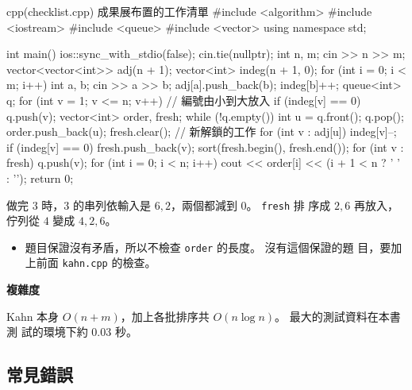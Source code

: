 \begin{example}[label=ex:checklist]{cpp}{(checklist.cpp) 成果展布置的工作清單}
#include <algorithm>
#include <iostream>
#include <queue>
#include <vector>
using namespace std;

int main() {
    ios::sync_with_stdio(false);
    cin.tie(nullptr);
    int n, m;
    cin >> n >> m;
    vector<vector<int>> adj(n + 1);
    vector<int> indeg(n + 1, 0);
    for (int i = 0; i < m; i++) {
        int a, b;
        cin >> a >> b;
        adj[a].push_back(b);
        indeg[b]++;
    }
    queue<int> q;
    for (int v = 1; v <= n; v++) {               // 編號由小到大放入
        if (indeg[v] == 0) {
            q.push(v);
        }
    }
    vector<int> order, fresh;
    while (!q.empty()) {
        int u = q.front();
        q.pop();
        order.push_back(u);
        fresh.clear();                           // 新解鎖的工作
        for (int v : adj[u]) {
            indeg[v]--;
            if (indeg[v] == 0) {
                fresh.push_back(v);
            }
        }
        sort(fresh.begin(), fresh.end());
        for (int v : fresh) {
            q.push(v);
        }
    }
    for (int i = 0; i < n; i++) {
        cout << order[i] << (i + 1 < n ? ' ' : '\n');
    }
    return 0;
}
\end{example}


做完 $3$ 時，$3$ 的串列依輸入是 $6, 2$，兩個都減到 $0$。 \texttt{fresh} 排
序成 $2, 6$ 再放入，佇列從 $4$ 變成 $4, 2, 6$。

\begin{itemize}
\item 題目保證沒有矛盾，所以不檢查 \texttt{order} 的長度。 沒有這個保證的題
目，要加上前面 \texttt{kahn.cpp} 的檢查。
\end{itemize}

\textbf{複雜度}

Kahn 本身 $O(n + m)$，加上各批排序共 $O(n \log n)$。 最大的測試資料在本書測
試的環境下約 $0.03$ 秒。

\subsection{常見錯誤}

